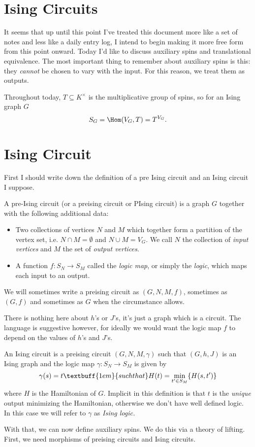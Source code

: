 \section{Ising Circuits}

It seems that up until this point I've treated this document more like a set of notes and less like a daily entry log, I intend to begin making it more free form from this point onward. Today I'd like to discuss auxiliary spins and translational equivalence. The most important thing to remember about auxiliary spins is this: they \emph{cannot} be chosen to vary with the input. For this reason, we treat them as outputs. 

Throughout today, $T\subseteq K^\times$ is the multiplicative group of spins, so for an Ising graph $G$
\begin{align*}
	S_G = \Hom(V_G,T) = T^{V_G}.
\end{align*}

\section{Ising Circuit}
First I should write down the definition of a pre Ising circuit and an Ising circuit I suppose.

\begin{defn}\label{defn:pre-ising-circuit}
	A pre-Ising circuit (or a preising circuit or PIsing circuit) is a graph $G$ together with the following additional data:
	\begin{itemize}
	\item Two collections of vertices $N$ and $M$ which together form a partition of the vertex set, i.e. $N \cap M = \emptyset$ and $N \cup M = V_G$. We call $N$ the collection of \emph{input vertices} and $M$ the set of \emph{output vertices}.
		\item A function $f:S_N\to S_M$ called the \emph{logic map}, or simply the \emph{logic}, which maps each input to an output.
	\end{itemize}
	We will sometimes write a preising circuit as $(G,N,M,f)$, sometimes as $(G,f)$ and sometimes as $G$ when the circumstance allows.
\end{defn}
There is nothing here about $h$'s or $J$'s, it's just a graph which is a circuit. The language is suggestive however, for ideally we would want the logic map $f$ to depend on the values of $h$'s and $J$'s.
\begin{defn}\label{defn:ising-circuit}
	An Ising circuit is a preising circuit $(G,N,M,\gamma)$ such that $(G,h,J)$ is an Ising graph and the logic map $\gamma:S_N\to S_M$ is given by
	\begin{align*}
		\gamma(s) = t \textbuff{1em}{such that} H(t) = \min_{t' \in S_M}\{H(s,t')\}
	\end{align*}
	where $H$ is the Hamiltonian of $G$. Implicit in this definition is that $t$ is the \emph{unique} output minimizing the Hamiltonian, otherwise we don't have well defined logic. In this case we will refer to $\gamma$ as \emph{Ising logic.}
\end{defn}
With that, we can now define auxiliary spins. We do this via a theory of lifting. First, we need morphisms of preising circuits and Ising circuits.


